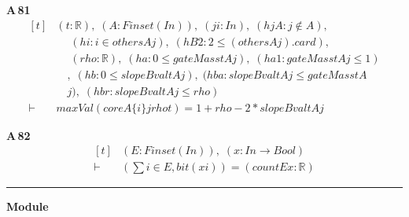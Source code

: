 \noindent\textbf{A\,81}\quad{}
{\footnotesize\[ \begin{aligned}[t]
&(\mathit{t} : \mathbb{R} ),\; (\mathit{A} : \mathit{Finset} (\mathit{I} \mathit{n})),\; (\mathit{j} \mathit{i} : \mathit{I} \mathit{n}),\; (\mathit{hjA} : \mathit{j} \notin \mathit{A}),\\
&\quad \; (\mathit{hi} : \mathit{i} \in \mathit{others} \mathit{A} \mathit{j}),\; (\mathit{hB2} : 2 \leq (\mathit{others} \mathit{A} \mathit{j}).\mathit{card}),\\
&\quad \; (\mathit{rho} : \mathbb{R} ),\; (\mathit{ha} : 0 \leq \mathit{gateMass} \mathit{t} \mathit{A} \mathit{j}),\; (\mathit{ha1} : \mathit{gateMass} \mathit{t} \mathit{A} \mathit{j} \leq 1)\\
&\quad ,\; (\mathit{hb} : 0 \leq \mathit{slopeBval} \mathit{t} \mathit{A} \mathit{j}),\; (\mathit{hba} : \mathit{slopeBval} \mathit{t} \mathit{A} \mathit{j} \leq \mathit{gateMass} \mathit{t} \mathit{A}\\
&\quad \mathit{j}),\; (\mathit{hbr} : \mathit{slopeBval} \mathit{t} \mathit{A} \mathit{j} \leq \mathit{rho})\\
\vdash\;&\mathit{maxVal} (\mathit{core} \mathit{A} \{ \mathit{i}\} \mathit{j} \mathit{rho} \mathit{t}) = 1+\mathit{rho}-2*\mathit{slopeBval} \mathit{t} \mathit{A} \mathit{j}
\end{aligned} \]}

\noindent\textbf{A\,82}\quad{}
{\footnotesize\[ \begin{aligned}[t]
&(\mathit{E} : \mathit{Finset} (\mathit{I} \mathit{n})),\; (\mathit{x} : \mathit{I} \mathit{n} \to \mathit{Bool})\\
\vdash\;&(\textstyle\sum \mathit{i} \in \mathit{E}, \mathit{bit} (\mathit{x} \mathit{i})) = (\mathit{count} \mathit{E} \mathit{x} : \mathbb{R} )
\end{aligned} \]}

\vspace{4pt}\noindent\rule{\columnwidth}{0.4pt}\par\vspace{2pt}
\noindent\textbf{Module }\par\vspace{3pt}

